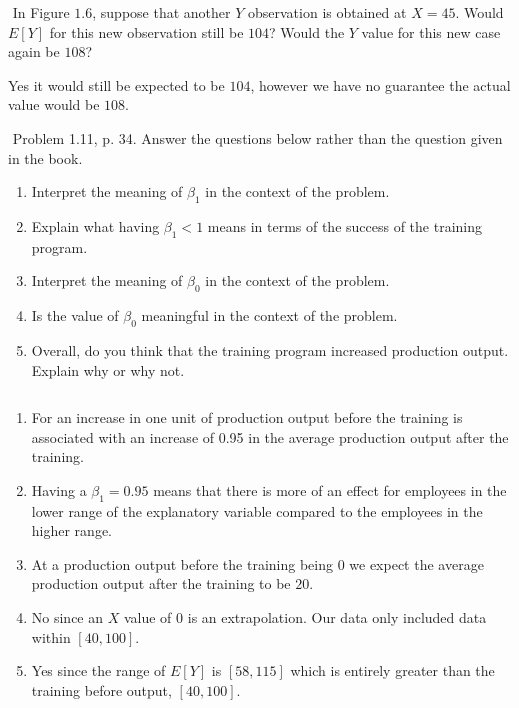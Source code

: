 \documentclass[10pt]{article}
\newenvironment{problem}[2][Problem]{\begin{trivlist}
\item[\hskip \labelsep {\bfseries #1}\hskip \labelsep {\bfseries #2.}]}{\end{trivlist}}
\newenvironment{answer}[2][Answer]{\begin{trivlist}
\item[\hskip \labelsep {\bfseries #1}\hskip \labelsep {\bfseries #2.}]}{\end{trivlist}}
\begin{document}
\begin{problem}{3}
$ $\newline
In Figure $1.6$, suppose that another $Y$ observation is obtained at $X=45$. Would $E[Y]$ for this new observation still be $104$? Would the $Y$ value for this new case again be $108$?
\end{problem}

\begin{answer}{3}
Yes it would still be expected to be $104$, however we have no guarantee the actual value would be $108$.
\end{answer}

\begin{problem}{4}
$ $\newline
Problem 1.11, p. 34.  Answer the questions below rather than the question given in the book.
\begin{enumerate}
    \item Interpret the meaning of $\beta_{1}$ in the context of the problem.
    \item Explain what having $\beta_{1} < 1$ means in terms of the success of the training program.
    \item Interpret the meaning of $\beta_{0}$ in the context of the problem.
    \item Is the value of $\beta_{0}$ meaningful in the context of the problem.
    \item Overall, do you think that the training program increased production output. Explain why or why not. 
\end{enumerate}
\end{problem}

\begin{answer}{4}
$ $\newline
\begin{enumerate}
    \item For an increase in one unit of production output before the training is associated with an increase of 0.95 in the average production output after the training.
    \item Having a $\beta_{1} = 0.95$ means that there is more of an effect for employees in the lower range of the explanatory variable compared to the employees in the higher range. 
    \item At a production output before the training being $0$ we expect the average production output after the training to be $20$.
    \item No since an $X$ value of $0$ is an extrapolation. Our data only included data within $[40,100]$.
    \item Yes since the range of $E[Y]$ is $[58,115]$ which is entirely greater than the training before output, $[40,100]$.
\end{enumerate}
\end{answer}
\end{document}
